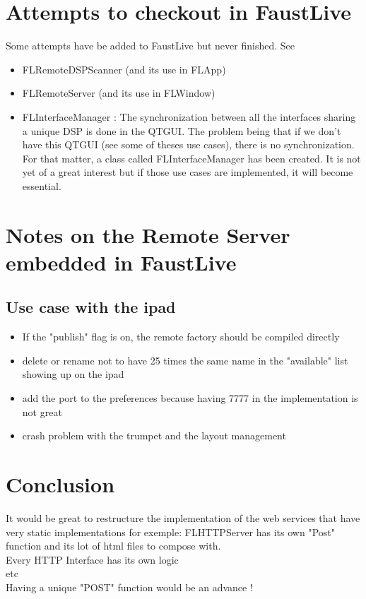 \documentclass[a4paper]{article}
\begin{document}
\section{Attempts to checkout in FaustLive}

Some attempts have be added to FaustLive but never finished. See
\begin{itemize}
\item FLRemoteDSPScanner (and its use in FLApp)
\item FLRemoteServer (and its use in FLWindow)
\item FLInterfaceManager : The synchronization between all the interfaces sharing a unique DSP is done in the QTGUI. The problem being that if we don't have this QTGUI (see some of theses use cases), there is no synchronization. For that matter, a class called FLInterfaceManager has been created. It is not yet of a great interest but if those use cases are implemented, it will become essential.
\end{itemize}

\section{Notes on the Remote Server embedded in FaustLive}
\subsection{Use case with the ipad}
\begin{itemize}
\item If the "publish" flag is on, the remote factory should be compiled directly
\item delete or rename not to have 25 times the same name in the "available" list showing up on the ipad
\item add the port to the preferences because having 7777 in the implementation is not great
\item crash problem with the trumpet and the layout management

\end{itemize}

\section{Conclusion}

It would be great to restructure the implementation of the web services that have very static implementations for exemple:
FLHTTPServer has its own "Post" function and its lot of html files to compose with. \\
Every HTTP Interface has its own logic \\
etc \\

Having a unique "POST" function would be an advance !
\end{document}
